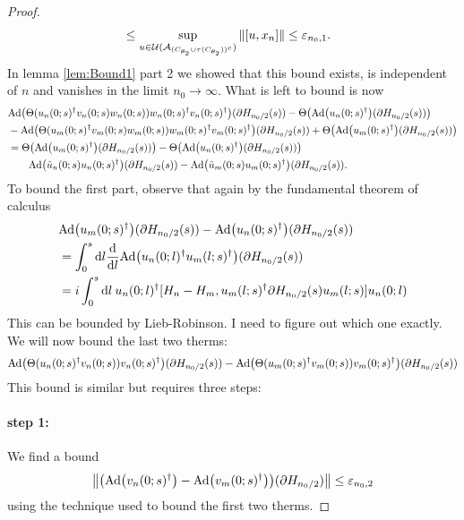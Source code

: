 \documentclass[12pt,a4paper,twoside]{article}
\renewcommand{\d}{\text{d}}
\let\originalleft\left
\let\originalright\right
\renewcommand{\left}{\mathopen{}\mathclose\bgroup\originalleft}
\renewcommand{\right}{\aftergroup\egroup\originalright}
\newcommand{\UU}{\mathcal U}
\renewcommand{\AA}{\mathcal A}
\newcommand{\Ad}[1]{\textrm{Ad}\left(#1\right)}
\theoremstyle{definition}
\numberwithin{equation}{section}
\begin{document}
\begin{proof}
\begin{align}
		&\leq \sup_{u\in\UU(\AA_{(C_{\theta_2}\cup \tau(C_{\theta_2}))^c})}\norm{[u,x_n]}\leq \varepsilon_{n_0,1}.
	\end{align}
	In lemma \ref{lem:Bound1} part 2 we showed that this bound exists, is independent of $n$ and vanishes in the limit $n_0\rightarrow\infty.$ What is left to bound is now
	\begin{align}
		&\Ad{\Theta(u_n(0;s)^\dagger v_n(0;s)w_n(0;s))w_n(0;s)^\dagger v_n(0;s)^\dagger}(\partial H_{n_0/2}(s))-\Theta\left(\Ad{u_n(0;s)^\dagger}(\partial H_{n_0/2}(s))\right)\\
		\nonumber
		&-\Ad{\Theta(u_m(0;s)^\dagger v_m(0;s)w_m(0;s))w_m(0;s)^\dagger v_m(0;s)^\dagger}(\partial H_{n_0/2}(s))+\Theta\left(\Ad{u_m(0;s)^\dagger}(\partial H_{n_0/2}(s))\right)\\
		&=\Theta\left(\Ad{u_m(0;s)^\dagger}(\partial H_{n_0/2}(s))\right)-\Theta\left(\Ad{u_n(0;s)^\dagger}(\partial H_{n_0/2}(s))\right)\\
		\nonumber
		&\qquad \Ad{\tilde{u}_n(0;s)u_n(0;s)^\dagger}(\partial H_{n_0/2}(s))-\Ad{\tilde{u}_m(0;s)u_m(0;s)^\dagger}(\partial H_{n_0/2}(s)).
	\end{align}
	To bound the first part, observe that again by the fundamental theorem of calculus
	\begin{align}
		&\Ad{u_m(0;s)^\dagger}(\partial H_{n_0/2}(s))-\Ad{u_n(0;s)^\dagger}(\partial H_{n_0/2}(s))\\
		&=\int_0^s\d l\frac{\d}{\d l}\Ad{u_n(0;l)^{\dagger}u_m(l;s)^{\dagger}}(\partial H_{n_0/2}(s))\\
		&=i\int_0^s\d l\: u_n(0;l)^{\dagger}[H_n-H_m,u_m(l;s)^{\dagger}\partial H_{n_0/2}(s)u_m(l;s)]u_n(0;l)
	\end{align}
	This can be bounded by Lieb-Robinson. {\color{red}I need to figure out which one exactly.} We will now bound the last two therms:
	\begin{align}
		\Ad{\Theta(u_n(0;s)^\dagger v_n(0;s)) v_n(0;s)^\dagger}(\partial H_{n_0/2}(s))-\Ad{\Theta(u_m(0;s)^\dagger v_m(0;s)) v_m(0;s)^\dagger}(\partial H_{n_0/2}(s))
	\end{align}
	This bound is similar but requires three steps:
	\paragraph{step 1:}We find a bound
	\begin{equation}
		\norm{\left(\Ad{v_n(0;s)^\dagger}-\Ad{v_m(0;s)^\dagger}\right)(\partial H_{n_0/2})}\leq \varepsilon_{n_0,2}
	\end{equation}
	using the technique used to bound the first two therms.

\end{proof}
\end{document}
